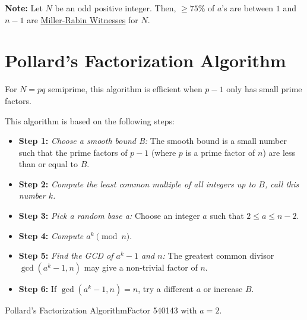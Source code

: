 \begin{note}
    \textbf{Note:} Let \(N\) be an odd positive integer. Then, \(\geq 75\%\) of \(a\)'s are between \(1\) and \(n - 1\) are \hyperlink{Miller-Rabin Witness}{Miller-Rabin Witnesses} for \(N\).
\end{note}

\section{Pollard's Factorization Algorithm}

For \(N = pq\) semiprime, this algorithm is efficient when \(p -1\) only has small prime factors.

This algorithm is based on the following steps:

\begin{itemize}
    \item \textbf{Step 1:} \textit{Choose a smooth bound B:} The smooth bound is a small number such that the prime factors of \(p - 1\) (where \(p\) is a prime factor of \(n\)) are less than or equal to \(B\).
    \item \textbf{Step 2:} \textit{Compute the least common multiple of all integers up to \(B\), call this number \(k\).}
    \item \textbf{Step 3:} \textit{Pick a random base a:} Choose an integer \(a\) such that \(2 \leq a \leq n - 2\).
    \item \textbf{Step 4:} \textit{Compute \(a^{k} \pmod{n}\)}.
    \item \textbf{Step 5:} \textit{Find the GCD of \(a^k - 1\) and \(n\):} The greatest common divisor \(\gcd(a^k - 1, n)\) may give a non-trivial factor of \(n\).
    \item \textbf{Step 6:} If \(\gcd(a^k - 1,n) = n\), try a different \(a\) or increase \(B\).
\end{itemize}

\begin{example}
    {Pollard's Factorization Algorithm}Factor 540143 with \(a = 2\).
\end{example}


